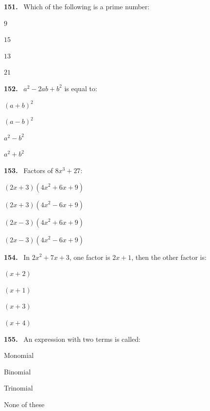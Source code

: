 \documentclass[11pt]{article}
\newenvironment{qenv}[1]{%
  \par\medskip\noindent\textbf{#1.}\ \ignorespaces
}{\par}
\begin{document}
\begin{qenv}{151} Which of the following is a prime number:
\begin{options} \item $9$ \item $15$ \item $13$ \item $21$ \end{options} \end{qenv}

\begin{qenv}{152} $a^2-2ab+b^2$ is equal to:
\begin{options} \item $(a+b)^2$ \item $(a-b)^2$ \item $a^2-b^2$ \item $a^2+b^2$ \end{options} \end{qenv}

\begin{qenv}{153} Factors of $8x^3+27$:
\begin{options} \item $(2x+3)(4x^2+6x+9)$ \item $(2x+3)(4x^2-6x+9)$ \item $(2x-3)(4x^2+6x+9)$ \item $(2x-3)(4x^2-6x+9)$ \end{options} \end{qenv}

\begin{qenv}{154} In $2x^2+7x+3$, one factor is $2x+1$, then the other factor is:
\begin{options} \item $(x+2)$ \item $(x+1)$ \item $(x+3)$ \item $(x+4)$ \end{options} \end{qenv}

\begin{qenv}{155} An expression with two terms is called:
\begin{options} \item Monomial \item Binomial \item Trinomial \item None of these \end{options} \end{qenv}
\end{document}
